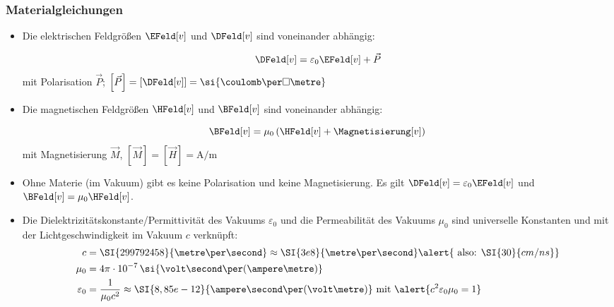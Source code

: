     \begin{frame}
      \frametitle{Materialgleichungen}
      \begin{itemize}[<+->]
        \item Die elektrischen Feldgrößen $\EFeld[v]$ und $\DFeld[v]$
          sind voneinander abhängig:
          
          $$
         \DFeld[v] = \varepsilon_0 \EFeld[v] +\vec{P}
                $$
           mit \alert{Polarisation} $\vec{P}$; $\left[\vec{P}\right] = \left[\DFeld[v]\right] =
           \si{\coulomb\per\square\metre}$
           \item Die magnetischen Feldgrößen $\HFeld[v]$ und
             $\BFeld[v]$ sind voneinander abhängig:

             $$
             \BFeld[v] = \mu_0  \left( \HFeld[v] + \Magnetisierung[v] \right)
             $$
             mit \alert{Magnetisierung} $\vec{M}$, $\left[\vec{M}\right] =
             \left[\vec{H}\right] = \si{\ampere\per\metre}$
             \item Ohne Materie (im \alert{Vakuum}) gibt es keine
               Polarisation und keine Magnetisierung. Es gilt
               $\DFeld[v] = \varepsilon_0 \EFeld[v]$ und
               $\BFeld[v] = \mu_0  \HFeld[v]$.
               \item Die \alert{Dielektrizitätskonstante/Permittivität des Vakuums}
                 $\varepsilon_0$ und die \alert{Permeabilität des
                   Vakuums} $\mu_0$ sind universelle Konstanten und
                 mit der \alert{Lichtgeschwindigkeit im Vakuum} $c$
                 verknüpft:
                 \begin{align*}
                   c & = \SI{299792458}{\metre\per\second} \approx
                       \SI{3e8}{\metre\per\second} \alert{\text{
                       also: } \SI{30}{cm / ns}}\\
                   \mu_0 & = 4\pi\cdot
                   10^{-7}\,\si{\volt\second\per(\ampere\metre)}\\
                   \varepsilon_0 & = \dfrac{1}{\mu_0  c^2} \approx
                   \SI{8,85e-12}{\ampere\second\per(\volt\metre)}
                   \text{ mit } \alert{c^2\varepsilon_0\mu_0 = 1} 
                   \end{align*}
               \end{itemize}
       \end{frame}

